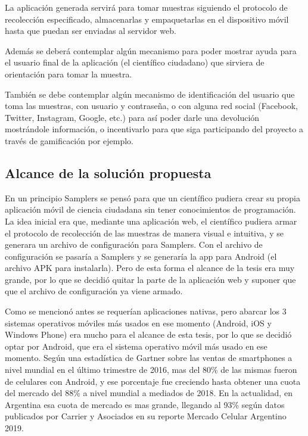 La aplicación generada servirá para tomar muestras siguiendo el protocolo de recolección especificado, almacenarlas y empaquetarlas en el dispositivo móvil hasta que puedan ser enviadas al servidor web.

Además se deberá contemplar algún mecanismo para poder mostrar ayuda para el usuario final de la aplicación (el científico ciudadano) que sirviera de orientación para tomar la muestra. 

También se debe contemplar algún mecanismo de identificación del usuario que toma las muestras, con usuario y contraseña, o con alguna red social (Facebook, Twitter, Instagram, Google, etc.) para así poder darle una devolución mostrándole información, o incentivarlo para que siga participando del proyecto a través de gamificación por ejemplo.



\subsection{Alcance de la solución propuesta}
En un principio Samplers se pensó para que un científico pudiera crear su propia aplicación móvil de ciencia ciudadana sin tener conocimientos de programación. 
La idea inicial era que, mediante una aplicación web, el científico pudiera armar el protocolo de recolección de las muestras de manera visual e intuitiva, y se generara un archivo de configuración para Samplers. 
Con el archivo de configuración se pasaría a Samplers y se generaría la app para Android (el archivo APK para instalarla). 
Pero de esta forma el alcance de la tesis era muy grande, por lo que se decidió quitar la parte de la aplicación web y suponer que que el archivo de configuración ya viene armado.

Como se mencionó antes se requerían aplicaciones nativas, pero abarcar los 3 sistemas operativos móviles más usados en ese momento (Android, iOS y Windows Phone) era mucho para el alcance de esta tesis, por lo que se decidió optar por Android, que era el sistema operativo móvil más usado en ese momento. Según una estadística de Gartner sobre las ventas de smartphones a nivel mundial en el último trimestre de 2016\cite{gartner}, mas del 80\% de las mismas fueron de celulares con Android, y ese porcentaje fue creciendo hasta obtener una cuota del mercado del 88\% a nivel mundial a mediados de 2018. En la actualidad, en Argentina esa cuota de mercado es mas grande, llegando al 93\% según datos publicados por Carrier y Asociados en su reporte Mercado Celular Argentino 2019\cite{carrier}.

